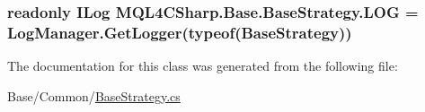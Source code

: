 \subsubsection[{\texorpdfstring{L\+OG}{LOG}}]{\setlength{\rightskip}{0pt plus 5cm}readonly I\+Log M\+Q\+L4\+C\+Sharp.\+Base.\+Base\+Strategy.\+L\+OG = Log\+Manager.\+Get\+Logger(typeof({\bf Base\+Strategy}))\hspace{0.3cm}{\ttfamily [static]}}\hypertarget{class_m_q_l4_c_sharp_1_1_base_1_1_base_strategy_a92846a7a1198a9df13623f09fd2b11a1}{}\label{class_m_q_l4_c_sharp_1_1_base_1_1_base_strategy_a92846a7a1198a9df13623f09fd2b11a1}


The documentation for this class was generated from the following file\+:\begin{DoxyCompactItemize}
\item 
Base/\+Common/\hyperlink{_base_strategy_8cs}{Base\+Strategy.\+cs}\end{DoxyCompactItemize}
